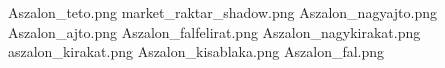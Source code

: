 Aszalon_teto.png
market_raktar_shadow.png
Aszalon_nagyajto.png
Aszalon_ajto.png
Aszalon_falfelirat.png
Aszalon_nagykirakat.png
aszalon_kirakat.png
Aszalon_kisablaka.png
Aszalon_fal.png
